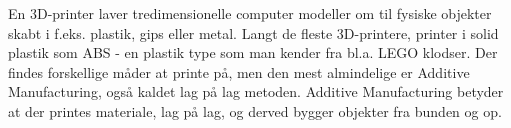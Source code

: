 En 3D-printer laver tredimensionelle computer modeller om til fysiske objekter skabt i f.eks. plastik, gips eller metal. Langt de fleste 3D-printere, printer i solid plastik som ABS - en plastik type som man kender fra bl.a. LEGO klodser. Der findes forskellige måder at printe på, men den mest almindelige er Additive Manufacturing, også kaldet lag på lag metoden. Additive Manufacturing betyder at der printes materiale, lag på lag, og derved bygger objekter fra bunden og op. 
